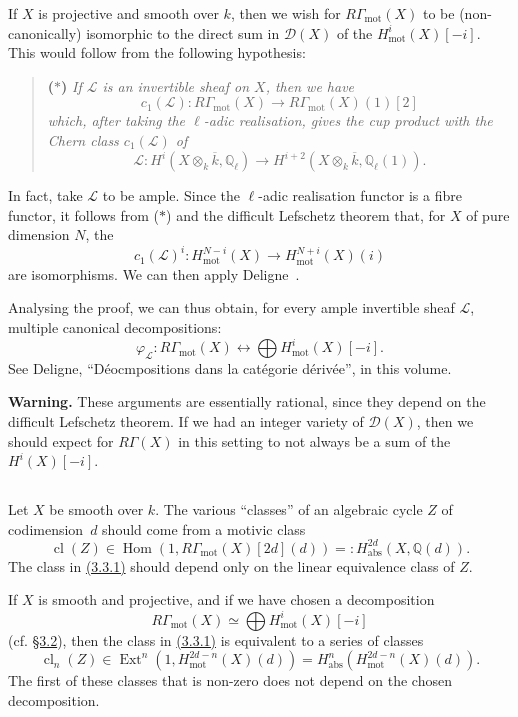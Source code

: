 \documentclass{article}
\theoremstyle{plain}
\theoremstyle{definition}
\newcommand{\scr}[1]{{\mathscr{#1}}}
\newcommand{\QQ}{\mathbb{Q}}
\newcommand{\mot}{\mathrm{mot}}
\newcommand{\abs}{\mathrm{abs}}
\DeclareMathOperator{\Hom}{Hom}
\DeclareMathOperator{\Ext}{Ext}
\DeclareMathOperator{\cl}{cl}
\newcommand{\oldpage}[1]{\marginpar{\footnotesize$\Big\vert$ \textit{p.~#1}}}
\begin{document}
If $X$ is projective and smooth over $k$, then we wish for $R\Gamma_\mot(X)$ to be (non-canonically) isomorphic to the direct sum in $\scr{D}(X)$ of the $H_\mot^i(X)[-i]$.
This would follow from the following hypothesis:
\begin{quote}
  \textbf{($*$)}
\itshape
  If $\scr{L}$ is an invertible sheaf on $X$, then we have
  \[c_1(\scr{L})\colon R\Gamma_\mot(X)\to R\Gamma_\mot(X)(1)[2]\]
  which, after taking the $\ell$-adic realisation, gives the cup product with the Chern class $c_1(\scr{L})$ of
  \[\scr{L}\colon H^i(X\otimes_k\overline{k},\QQ_\ell) \to H^{i+2}(X\otimes_k\overline{k},\QQ_\ell(1)).\]
\end{quote}

In fact, take $\scr{L}$ to be ample.
Since the $\ell$-adic realisation functor is a fibre functor, it follows from ($*$) and the difficult Lefschetz theorem that, for $X$ of pure dimension $N$, the
\[
  c_1(\scr{L})^i\colon H_\mot^{N-i}(X) \to H_\mot^{N+i}(X)(i)
\]
are isomorphisms.
We can then apply Deligne~\cite{8}.

\oldpage{156}
Analysing the proof, we can thus obtain, for every ample invertible sheaf $\scr{L}$, multiple canonical decompositions:
\[
  \varphi_\scr{L}\colon R\Gamma_\mot(X) \leftrightarrow \bigoplus H_\mot^i(X)[-i].
\]
See Deligne, ``D\'{e}ocmpositions dans la cat\'{e}gorie d\'{e}riv\'{e}e'', in this volume.

\bigskip

\textbf{Warning.}
These arguments are essentially rational, since they depend on the difficult Lefschetz theorem.
If we had an integer variety of $\scr{D}(X)$, then we should expect for $R\Gamma(X)$ in this setting to not always be a sum of the $H^i(X)[-i]$.


\subsection{}
\label{3.3}

Let $X$ be smooth over $k$.
The various ``classes'' of an algebraic cycle $Z$ of codimension~$d$ should come from a motivic class
\[
\label{3.3.1}
  \cl(Z) \in \Hom(1,R\Gamma_\mot(X)[2d](d)) =: H_\abs^{2d}(X,\QQ(d)).
\tag{3.3.1}
\]
The class in \hyperref[3.3.1]{(3.3.1)} should depend only on the linear equivalence class of $Z$.

If $X$ is smooth and projective, and if we have chosen a decomposition
\[
  R\Gamma_\mot(X) \simeq \bigoplus H_\mot^i(X)[-i]
\]
(cf. \hyperref[3.2]{\S3.2}), then the class in \hyperref[3.3.1]{(3.3.1)} is equivalent to a series of classes
\[
\label{3.3.2}
  \cl_n(Z) \in \Ext^n(1,H_\mot^{2d-n}(X)(d)) = H_\abs^n(H_\mot^{2d-n}(X)(d)).
\tag{3.3.2}
\]
The first of these classes that is non-zero does not depend on the chosen decomposition.
\end{document}

